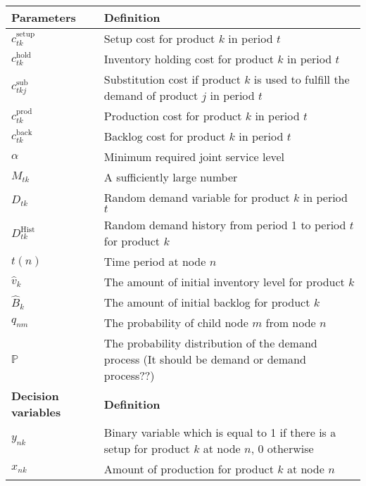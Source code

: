 \documentclass[10pt]{article}
\newcommand{\ti}{t} %
\newcommand{\ka}{k} %
\newcommand{\jey}{j} %
\newcommand{\Bi}{B} %
\newcommand{\Vi}{v} %
\newcommand{\x}{x} %
\newcommand{\y}{y} %
\newcommand{\InvPos}{inventory level after production }
\begin{document}
\begin{table}[H]
\begin{adjustbox}{width=1\textwidth,center=\textwidth}
\begin{tabular}{ll}
\midrule 
{\textbf {Parameters}} & {\textbf {Definition}} \\ \midrule
$c^{\text{setup}}_{\ti \ka}$ & Setup cost for product $\ka$ in period $\ti$ \\ 
$c^{\text{hold}}_{\ti \ka}$  & Inventory holding cost for product $k$ in period $\ti$  \\ 
$c^{\text{sub}}_{\ti \ka \jey }$  & Substitution cost if product $\ka$  is used to fulfill the demand of product $\jey$  in period $\ti$  \\ 
$c^{\text{prod}}_{\ti \ka}$  & Production cost for product $\ka$ in period $\ti$  \\
$c^{\text{back}}_{\ti \ka}$  & Backlog cost for product $\ka$  in period $\ti$ \\
$\alpha$  & Minimum required joint service level \\ 
$M_{\ti \ka}$  & A sufficiently large number \\ 
${D}_{\ti \ka}$ & Random demand variable for product $\ka $ in period $\ti$  \\ 
${D}^\text{Hist}_{\ti \ka}$ & Random demand history from period 1 to period $\ti$ for product $\ka $  \\ 
$\ti(n)$ & Time period at node $n$  \\ 
$\hat{\Vi}_{\ka} $&  The amount of initial inventory level for product $\ka$ \\
$\hat{\Bi}_{\ka} $&  The amount of initial backlog for product $\ka$   \\
$q_{nm} $&  The probability of child node $m$ from node $n$  \\
$\mathbb{P} $&  The probability distribution of the demand process (It should be demand or demand process??)\\ 
\midrule
{\textbf {Decision variables}} & {\textbf {Definition}} \\ \midrule
$\y_{n \ka}$ & Binary variable which is equal to 1 if there is a setup for product $k$ at node $n$, 0 otherwise \\ 
$\x_{n \ka}$ & Amount of production for product $\ka$  at node $n$  \\ 

\end{tabular}
\end{adjustbox}
\end{table}
\end{document}
